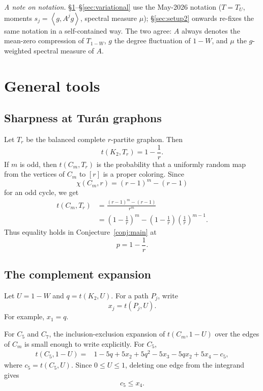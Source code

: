 \documentclass[11pt]{article}
\newcommand{\ip}[2]{\left\langle #1,#2\right\rangle}
\begin{document}
\medskip
\noindent\emph{A note on notation.}  \S\ref{sec:tools}--\S\ref{sec:variational} use the May-2026 notation ($T=T_U$, moments $s_j=\ip{g}{A^jg}$, spectral measure $\mu$); \S\ref{sec:setup2} onwards re-fixes the same notation in a self-contained way.  The two agree: $A$ always denotes the mean-zero compression of $T_{1-W}$, $g$ the degree fluctuation of $1-W$, and $\mu$ the $g$-weighted spectral measure of $A$.

\section{General tools}\label{sec:tools}

\subsection{Sharpness at Tur\'an graphons}

Let $T_r$ be the balanced complete $r$-partite graphon.  Then
\[
        t(K_2,T_r)=1-\frac1r.
\]
If $m$ is odd, then $t(C_m,T_r)$ is the probability that a uniformly random map from the vertices of $C_m$ to $[r]$ is a proper coloring.  Since
\[
        \chi(C_m,r)=(r-1)^m-(r-1)
\]
for an odd cycle, we get
\[
\begin{aligned}
        t(C_m,T_r)
        &=\frac{(r-1)^m-(r-1)}{r^m}  \\
        &=\left(1-\frac1r\right)^m
          -\left(1-\frac1r\right)\left(\frac1r\right)^{m-1}.
\end{aligned}
\]
Thus equality holds in Conjecture~\ref{conj:main} at
\[
        p=1-\frac1r.
\]

\subsection{The complement expansion}

Let $U=1-W$ and $q=t(K_2,U)$.  For a path $P_j$, write
\[
        x_j=t(P_j,U).
\]
For example, $x_1=q$.

For $C_5$ and $C_7$, the inclusion-exclusion expansion of $t(C_m,1-U)$ over the edges of $C_m$ is small enough to write explicitly.  For $C_5$,
\begin{equation}\label{eq:C5-expansion}
\begin{aligned}
    t(C_5,1-U)
    ={}&1-5q+5x_2+5q^2-5x_3-5qx_2+5x_4-c_5,
\end{aligned}
\end{equation}
where $c_5=t(C_5,U)$.  Since $0\le U\le 1$, deleting one edge from the integrand gives
\[
        c_5\le x_4.
\]
\end{document}
